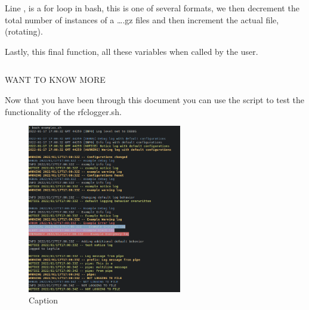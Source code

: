 \documentclass{article}
\begin{document}
Line , is a for loop in bash, this is one of several formats, we then decrement the total number of instances of a \ldots*.gz files and then increment the actual file, (rotating).

Lastly, this final function,  all these  variables when called by the user. 
\inputminted[frame=single,firstline=217,lastline=234,linenos]{bash}{rfclogger.sh}

\begin{shaded} 
\textbf{\faSpaceShuttle} \hspace{1em} WANT TO KNOW MORE

Now that you have been through this document you can use the  script to test the functionality of the rfclogger.sh. 

\begin{figure}[H]
    \centering
    \includegraphics[width=0.6\textwidth]{images/output.PNG}
    \caption{Caption}
\end{figure}
\end{shaded}
\end{document}
